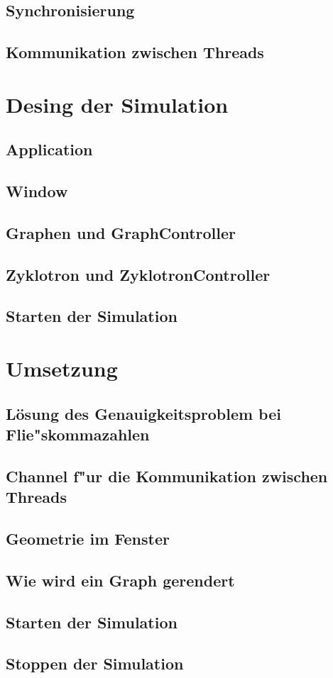 \documentclass[14pt, a4paper]{report}
\begin{document}
\section{Synchronisierung}
\section{Kommunikation zwischen Threads}

\chapter{Desing der Simulation}
\section{Application}
\section{Window} 
\section{Graphen und GraphController}
\section{Zyklotron und ZyklotronController}
\section{Starten der Simulation}

\chapter{Umsetzung}
\section{Lösung des Genauigkeitsproblem bei Flie"skommazahlen}
\section{Channel f"ur die Kommunikation zwischen Threads}
\section{Geometrie im Fenster}
\section{Wie wird ein Graph gerendert}
\section{Starten der Simulation}
\section{Stoppen der Simulation}
\end{document}
